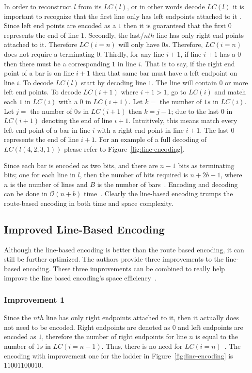In order to reconstruct $l$ from its $LC(l)$, or in other words decode
$LC(l)$ it is important to recognize that the first line only has left endpoints attached to it
\cite{A5}. Since left end points are encoded as a $1$ then it is guaranteed that the first $0$ 
represents the end of line $1$. Secondly, the last/$nth$ line 
has only right end points attached to it.  Therefore $LC(i=n)$ will only have $0s$. Therefore, $LC(i=n)$
does not require a terminating $0$. Thirdly, for any 
line $i+1$, if line $i+1$ has a $0$ then there must be a corresponding $1$
in line $i$. That is to say, if the right end point of a bar is on line 
$i+1$ then that same bar must have a left endpoint on line $i$. To decode 
$LC(l)$ start by decoding line $1$. The line will contain $0$ or more 
left end points. To decode $LC(i+1)$ where $i+1>1$, go to 
$LC(i)$ and match each $1$ in $LC(i)$ with a $0$ in $LC(i+1)$. 
Let $k=$ the number of $1s$ in $LC(i)$. Let $j=$ the number 
of $0s$ in $LC(i+1)$ then $k=j-1$; due to the last $0$ in $LC(i+1)$ denoting 
the end of line $i+1$.  Intuitively, this means match every left end point 
of a bar in line $i$ with a right end point in line $i+1$. The last $0$
represents the end of line $i+1$. For an example of a full decoding of $LC(l(4,2,3,1))$
please refer to Figure~\ref{fig:line-encoding}.\par 

Since each bar is encoded as two bits, and there are $n-1$ bits as terminating bits; 
one for each line in $l$, then the number of bits required is $n + 2b -1$, where $n$
is the number of lines and $B$ is the number of bars~\cite{A5}. Encoding and decoding can be 
done in $\mathcal{O}(n+b)$ time~\cite{A5}. Clearly the line-based encoding 
trumps the route-based encoding in both time and space complexity.

\subsection{Improved Line-Based Encoding}
Although the line-based encoding is better than the route based 
encoding, it can still be further optimized. The authors provide 
three improvements to the line-based encoding. These three improvements
can be combined to really help improve the line based encoding's 
space efficiency~\cite{A5}. 
\subsubsection{Improvement 1}
Since the $nth$ line has only right endpoints attached to it, 
then it actually does not need to be encoded. Right endpoints 
are denoted as $0$ and left endpoints are encoded as $1$, therefore the number of right endpoints 
for line $n$ is equal to the number of $1s$ in $LC(i=n-1)$.
Thus, there is no need for $LC(i=n)$~\cite{A5}. The encoding with improvement 
one for the ladder in Figure~\ref{fig:line-encoding} is $11\underline{0}0110\underline{0}010$.
